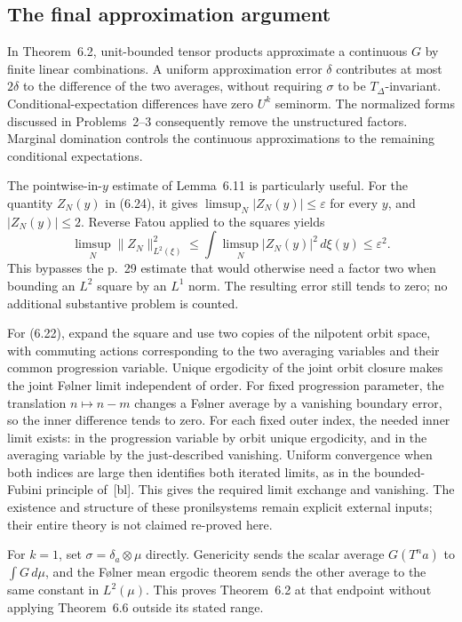 \documentclass[10pt]{article}
\begin{document}
\subsection*{The final approximation argument}
In Theorem 6.2, unit-bounded tensor products approximate a continuous \(G\) by finite linear combinations. A uniform approximation error \(\delta\) contributes at most \(2\delta\) to the difference of the two averages, without requiring \(\sigma\) to be \(T_\Delta\)-invariant. Conditional-expectation differences have zero \(U^k\) seminorm. The normalized forms discussed in Problems 2–3 consequently remove the unstructured factors. Marginal domination controls the continuous approximations to the remaining conditional expectations.\par
The pointwise-in-\(y\) estimate of Lemma 6.11 is particularly useful. For the quantity \(Z_N(y)\) in (6.24), it gives \(\limsup_N|Z_N(y)|\leq\varepsilon\) for every \(y\), and \(|Z_N(y)|\leq2\). Reverse Fatou applied to the squares yields \[\limsup_N\|Z_N\|_{L^2(\xi)}^2
 \leq\int\limsup_N |Z_N(y)|^2\,d\xi(y)
 \leq\varepsilon^2.\] This bypasses the p. 29 estimate that would otherwise need a factor two when bounding an \(L^2\) square by an \(L^1\) norm. The resulting error still tends to zero; no additional substantive problem is counted.\par
For (6.22), expand the square and use two copies of the nilpotent orbit space, with commuting actions corresponding to the two averaging variables and their common progression variable. Unique ergodicity of the joint orbit closure makes the joint Følner limit independent of order. For fixed progression parameter, the translation \(n\mapsto n-m\) changes a Følner average by a vanishing boundary error, so the inner difference tends to zero. For each fixed outer index, the needed inner limit exists: in the progression variable by orbit unique ergodicity, and in the averaging variable by the just-described vanishing. Uniform convergence when both indices are large then identifies both iterated limits, as in the bounded-Fubini principle of [bl]. This gives the required limit exchange and vanishing. The existence and structure of these pronilsystems remain explicit external inputs; their entire theory is not claimed re-proved here.\par
For \(k=1\), set \(\sigma=\delta_a\otimes\mu\) directly. Genericity sends the scalar average \(G(T^na)\) to \(\int G\,d\mu\), and the Følner mean ergodic theorem sends the other average to the same constant in \(L^2(\mu)\). This proves Theorem 6.2 at that endpoint without applying Theorem 6.6 outside its stated range.\par
\end{document}
